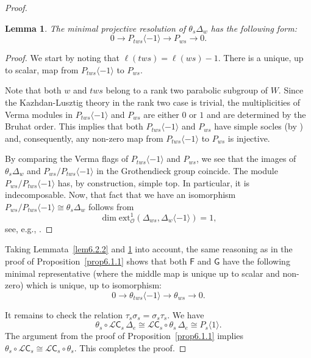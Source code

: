 \documentclass[a4paper]{amsart}
\newtheorem{lemma}[theorem]{Lemma}
\begin{document}
\begin{proof}
\begin{lemma}\label{lem6.2.3}
The minimal  projective resolution of $\theta_s\Delta_w$ has the following form:
\begin{displaymath}
0\to P_{tws}\langle -1\rangle\to P_{ws}\to  0. 
\end{displaymath}
\end{lemma}

\begin{proof}
We start by noting  that $\ell(tws)=\ell(ws)-1$. There is a unique, up to scalar, map 
from $P_{tws}\langle -1\rangle$ to $P_{ws}$. 

Note that both $w$ and $tws$ belong
to a rank two parabolic subgroup of $W$. Since the Kazhdan-Lusztig theory in the
rank two case is trivial, the multiplicities of Verma modules in 
$P_{tws}\langle -1\rangle$ and $P_{ws}$ are either $0$ or $1$ and are determined
by the Bruhat order. This implies that  both $P_{tws}\langle -1\rangle$ and $P_{ws}$
have simple socles (by \cite[Theorem~8.1]{St}) and, consequently, any non-zero map 
from $P_{tws}\langle -1\rangle$ to $P_{ws}$ is injective.  

By comparing the Verma flags of $P_{tws}\langle -1\rangle$ and $P_{ws}$,
we see that the images of $\theta_s\Delta_w$ and $P_{ws}/P_{tws}\langle -1\rangle$
in the Grothendieck group coincide. The module $P_{ws}/P_{tws}\langle -1\rangle$
has, by construction,  simple top. In particular, it is indecomposable.
Now, that fact that we have an isomorphism $P_{ws}/P_{tws}\langle -1\rangle\cong \theta_s\Delta_w$
follows from
$$\dim\mathrm{ext}^1_{\mathcal{O}}(\Delta_{ws},\Delta_w\langle -1\rangle)=1,$$
see, e.g., \cite[Corollary~23]{Ma07}.
\end{proof}

Taking Lemmata~\ref{lem6.2.2} and \ref{lem6.2.3} into account,
the same reasoning as in the proof of Proposition~\ref{prop6.1.1}
shows that both $\mathsf{F}$ and $\mathsf{G}$ have the following minimal
representative (where the middle map is unique up to scalar and non-zero)
which is unique, up to isomorphism:
\begin{equation}\label{eqaaa111}
0\to \theta_{tws}\langle -1\rangle\to \theta_{ws}\to  0. 
\end{equation}

It remains to check the relation $\tau_s\sigma_s=\sigma_s\tau_s$.
We have $$\theta_s\circ\mathcal{L}\mathsf{C}_s\,\Delta_e\cong
\mathcal{L}\mathsf{C}_s\circ\theta_s\,\Delta_e\cong P_s\langle 1\rangle.$$
The argument from the proof of Proposition~\ref{prop6.1.1}
implies $\theta_s\circ\mathcal{L}\mathsf{C}_s
\cong\mathcal{L}\mathsf{C}_s\circ\theta_s$.
This completes the proof.
\end{proof}
\end{document}
